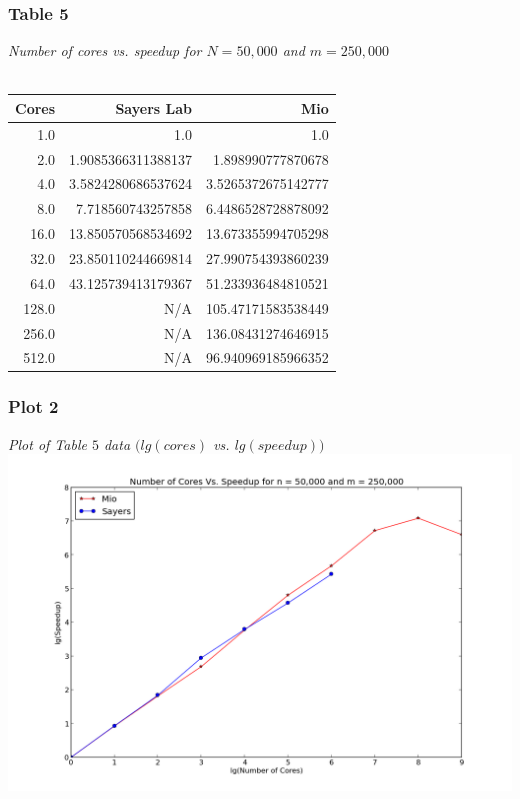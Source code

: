 \documentclass[letterpaper, 12pt]{article}
\begin{document}
	\subsubsection*{Table 5} \small\textit{Number of cores vs. speedup for $N=50,000$ and $m=250,000$} \\\\
	\normalsize
	\begin{tabular}{r||r|r}
	\hline
  Cores              &Sayers Lab                     &Mio \\ 
	\hline
		  1.0                     &1.0                     &1.0 \\ 
		  2.0      &1.9085366311388137       &1.898990777870678 \\ 
		  4.0      &3.5824280686537624      &3.5265372675142777 \\ 
		  8.0       &7.718560743257858      &6.4486528728878092 \\ 
		 16.0      &13.850570568534692      &13.673355994705298 \\ 
		 32.0      &23.850110244669814      &27.990754393860239 \\ 
		 64.0      &43.125739413179367      &51.233936484810521 \\ 
		128.0                     &N/A      &105.47171583538449 \\ 
		256.0                     &N/A      &136.08431274646915 \\ 
		512.0                     &N/A      &96.940969185966352 \\ 
		\hline
	\end{tabular}
	
	\subsubsection*{Plot 2} \small\textit{Plot of Table $5$ data $(lg(cores)$ vs. $lg(speedup))$} \\
	\normalsize
	\includegraphics[width=.75\linewidth]{ProjectFiles/results/plots/coresVspeedup.png}
	
\end{document}

